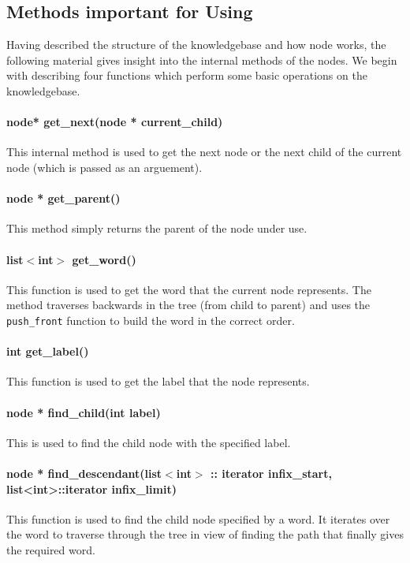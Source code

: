 	
\subsection{Methods important for Using \libalf}
	
	Having described the structure of the knowledgebase and how node works, the following material gives insight into the internal methods of the nodes. We begin with describing four functions which perform some basic operations on the knowledgebase.
		
\paragraph{node* get\_next(node * current\_child)}
	This internal method is used to get the next node or the next child of the current node (which is passed as an arguement). 
	
\paragraph{node * get\_parent()}
	This method simply returns the parent of the node under use.

\paragraph{list$<$int$>$ get\_word()}
	This function is used to get the word that the current node represents. The method traverses backwards in the tree (from child to parent) and uses the \texttt{push\_front} function to build the word in the correct order.
	
\paragraph{int get\_label()}	
	This function is used to get the label that the node represents.
	
\paragraph{node * find\_child(int label)}
	This is used to find the child node with the specified label.
	
\paragraph{node * find\_descendant(list$<$int$>$ :: iterator infix\_start, list<int>::iterator infix\_limit)}
	This function is used to find the child node specified by a word. It iterates over the word to traverse through the tree in view of finding the path that finally gives the required word.
\vskip 1pt \paragraph{}



